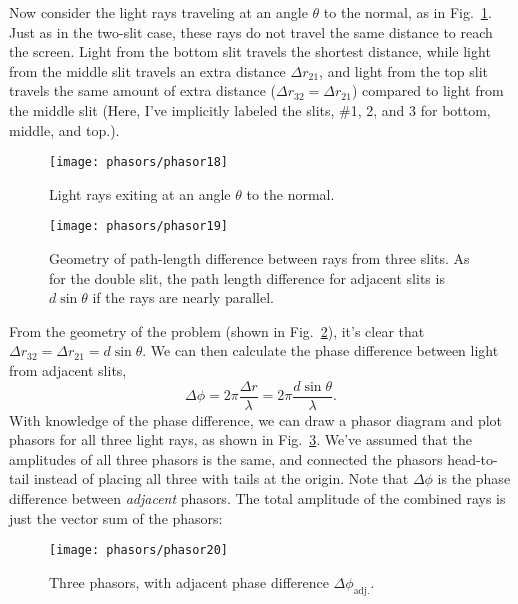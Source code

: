 Now consider the light rays traveling at an angle $\theta$ to the normal,
as in Fig.~\ref{fig:phasor18}.
 Just as in the two-slit case, these rays do not travel the
same distance to reach the screen. Light from the bottom slit travels
the shortest distance, while light from the middle slit travels an
extra distance $\Delta r_{21}$, and light from the top slit travels
the same amount of extra distance ($\Delta r_{32} = \Delta r_{21}$)
compared to light from the middle slit (Here, I've implicitly labeled
the slits, \#1, 2, and 3 for bottom, middle, and top.).


\begin{figure}\begin{center}
 \texttt{[image: phasors/phasor18]} 
\caption{\label{fig:phasor18}Light rays exiting at an angle $\theta$ to
the normal.}
\end{center}
\end{figure}


\begin{figure}\begin{center}
 \texttt{[image: phasors/phasor19]} 
\caption{\label{fig:phasor19}Geometry of path-length difference
between rays from three slits. As for the double slit, the path length
difference for adjacent slits is $d\sin\theta$ if the rays are nearly parallel.}
\end{center}
\end{figure}

From the geometry of the problem (shown in Fig.~\ref{fig:phasor19}), it's clear that $\Delta
r_{32} = \Delta r_{21} = d\sin{\theta}$. We can then calculate the
phase difference between light from adjacent slits,
\begin{equation}
\Delta \phi = 2\pi \frac{\Delta r}{\lambda}
= 2\pi \frac{d\sin{\theta}}{\lambda}.
\end{equation}
With knowledge of the phase difference, we can draw a phasor diagram
and plot phasors for all three light rays, as shown in Fig.~\ref{fig:phasor20}.
We've assumed that the amplitudes of all three phasors
is the same, and  connected the phasors head-to-tail instead of
placing all three with tails at the origin. Note that $\Delta\phi$ is
the phase difference between {\em adjacent} phasors. The total
amplitude of the combined rays is just the vector sum of the phasors:

\begin{figure}
\begin{center}
 \texttt{[image: phasors/phasor20]} 
\caption{\label{fig:phasor20}Three phasors, with adjacent phase difference
$\Delta\phi_\text{adj.}$.}
\end{center}
\end{figure}

